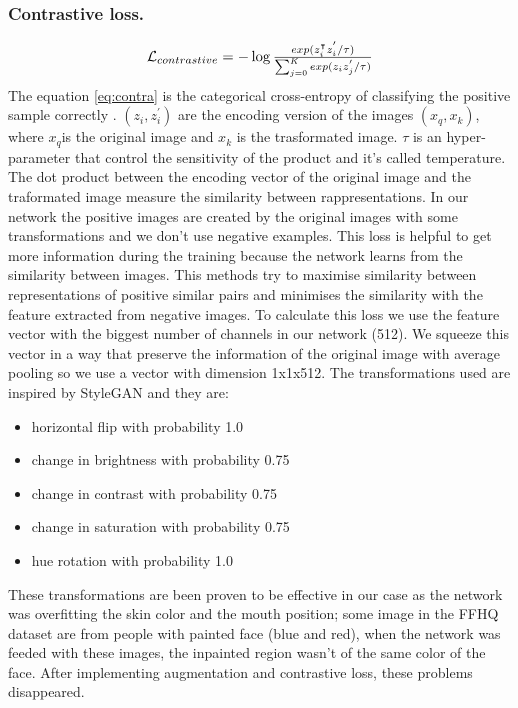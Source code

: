 \documentclass[10pt,twocolumn,letterpaper]{article}
\begin{document}
\subsubsection{Contrastive loss.}
\begin{equation}\label{eq:contra}
    \resizebox{.47 \textwidth}{!}{%
    $\mathcal{L}_{contrastive} = - \log{\frac{exp(z_{i}^\intercal z_{i}^{'}/\tau)}{\sum_{j=0}^{K}exp(z_{i}z_{j}^{'}/\tau)}}
    $%
    }
\end{equation}
The equation \eqref{eq:contra} is the categorical cross-entropy of classifying
the positive sample correctly \cite{oord2018representation}. \((z_{i},
z_{i}^{'})\) are the encoding version of the images \((x_{q}, x_{k})\), where
\(x_{q}\)is the original image and \(x_{k}\) is the trasformated image. \(\tau\)
is an hyper-parameter that control the sensitivity of the product and it's
called temperature. The dot product between the encoding vector of the original
image and the traformated image measure the similarity between rappresentations.
In our network the positive images are created by the original images with some
transformations and we don't use negative examples. This loss is helpful to get
more information during the training because the network learns from the
similarity between images. This methods try to maximise similarity between
representations of positive similar pairs and minimises the similarity with the
feature extracted from negative images\cite{le2020contrastive}.
To calculate this loss we use the feature vector with the biggest number of
channels in our network (512). We squeeze this vector in a way that preserve the
information of the original image with average pooling so we use a vector with
dimension 1x1x512. The transformations used are inspired by
StyleGAN\cite{karras2020analyzing} and they are:
\begin{itemize}
  \item horizontal flip with probability 1.0
  \item change in brightness with probability 0.75
  \item change in contrast with probability 0.75
  \item change in saturation with probability 0.75
  \item hue rotation with probability 1.0
\end{itemize}
These transformations are been proven to be effective in our case as the network
was overfitting the skin color and the mouth position; some image in the FFHQ
dataset are from people with painted face (blue and red), when the network was
feeded with these images, the inpainted region wasn't of the same color of the
face. After implementing augmentation and contrastive loss, these problems disappeared.
\end{document}

